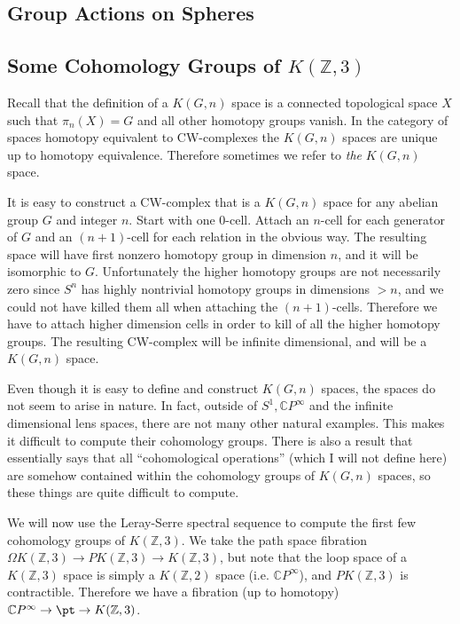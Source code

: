 \subsection{Group Actions on Spheres}


\subsection{Some Cohomology Groups of $K(\mathbb Z,3)$}

Recall that the definition of a $K(G,n)$ space is a connected topological space $X$ such that $\pi_n(X) = G$ and all other homotopy groups vanish. In the category of spaces homotopy equivalent to CW-complexes the $K(G,n)$ spaces are unique up to homotopy equivalence. Therefore sometimes we refer to \emph{the} $K(G,n)$ space. 

It is easy to construct a CW-complex that is a $K(G,n)$ space for any abelian group $G$ and integer $n$. Start with one 0-cell. Attach an $n$-cell for each generator of $G$ and an $(n+1)$-cell for each relation in the obvious way. The resulting space will have first nonzero homotopy group in dimension $n$, and it will be isomorphic to $G$. Unfortunately the higher homotopy groups are not necessarily zero since $S^n$ has highly nontrivial homotopy groups in dimensions $>n$, and we could not have killed them all when attaching the $(n+1)$-cells. Therefore we have to attach higher dimension cells in order to kill of all the higher homotopy groups. The resulting CW-complex will be infinite dimensional, and will be a $K(G,n)$ space.

Even though it is easy to define and construct $K(G,n)$ spaces, the spaces do not seem to arise in nature. In fact, outside of $S^1, \mathbb CP^\infty$ and the infinite dimensional lens spaces, there are not many other natural examples. This makes it difficult to compute their cohomology groups. There is also a result that essentially says that all ``cohomological operations'' (which I will not define here) are somehow contained within the cohomology groups of $K(G,n)$ spaces, so these things are quite difficult to compute.

We will now use the Leray-Serre spectral sequence to compute the first few cohomology groups of $K(\mathbb Z,3)$. We take the path space fibration $\Omega K(\mathbb Z,3) \rightarrow PK(\mathbb Z,3) \rightarrow K(\mathbb Z,3)$, but note that the loop space of a $K(\mathbb Z,3)$ space is simply a $K(\mathbb Z,2)$ space (i.e. $\mathbb CP^\infty$), and $PK(\mathbb Z,3)$ is contractible. Therefore we have a fibration (up to homotopy) $\mathbb CP^\infty \rightarrow \pt \rightarrow K(\mathbb Z,3)$. 

